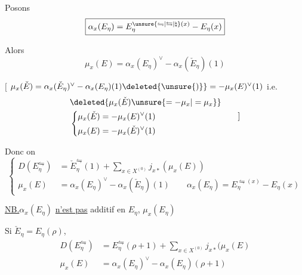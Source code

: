 Posons
\[
\boxed{\alpha_x(E_\eta)=E_\eta^{\unsure{\leftrightharpoons|\leftrightarrows|\natural}(x)}-E_\eta(x)}
\]

Alors
\[
\boxed{\mu_x(E)=\alpha_x(E_\eta)^\vee-\alpha_x(\check E_\eta)(1)}
\]

$[$ $\mu_x(\check E)=\alpha_x(\check E_\eta)^\vee-\alpha_x(E_\eta)(1)\deleted{\unsure{)}}=-\mu_x(E)^\vee(1)$ i.e.
\[
\begin{aligned}
&\deleted{\mu_x(\check E)\unsure{=-\mu_x|=\mu_x}}\\
&\left\{\begin{aligned}
\mu_x(\check E)&=-\mu_x(E)^\vee(1)\\
\mu_x(E)&=-\mu_x(\check E)^\vee(1)
\end{aligned}\right.
\end{aligned}\qquad ]
\]

Donc on 
\[
\boxed{\left\{\begin{aligned}
D(E_\eta^{\leftrightharpoons})&=\check E_\eta^{\leftrightharpoons}(1)+\sum_{x\in X^{(0)}}j_{x*}(\mu_x(E))\\
\mu_x(E)&=\alpha_x(E_\eta)^\vee-\alpha_x(\check E_\eta)(1)\qquad
\alpha_x(E_\eta)=E_\eta^{\leftrightharpoons(x)}-E_\eta(x)
\end{aligned}\right.}
\]

\uline{NB.}\quad $\alpha_x(E_\eta)$ \uline{n'est pas} additif en $E_\eta$,  $\mu_x(E_\eta)$ 

Si $\check E_\eta=E_\eta(\rho)$, 
\[
\boxed{\begin{aligned}
D(E_\eta^{\leftrightharpoons})&=E_\eta^{\leftrightharpoons}(\rho+1)+\sum_{x\in X^{(0)}}j_{x*}(\mu_x(E)\\
\mu_x(E)&=\alpha_x(E_\eta)^\vee-\alpha_x(E_\eta)(\rho+1)
\end{aligned}}
\]
